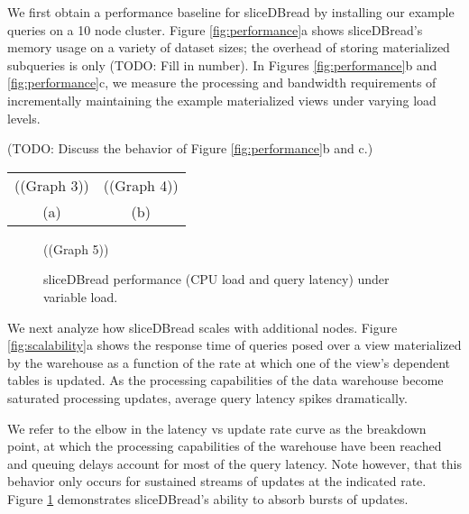 We first obtain a performance baseline for sliceDBread by installing our example queries on a 10 node cluster.  Figure \ref{fig:performance}a shows sliceDBread's memory usage on a variety of dataset sizes; the overhead of storing materialized subqueries is only (TODO: Fill in number).  In Figures \ref{fig:performance}b and \ref{fig:performance}c, we measure the processing and bandwidth requirements of incrementally maintaining the example materialized views under varying load levels.

(TODO: Discuss the behavior of Figure \ref{fig:performance}b and c.)

\begin{figure*}
\begin{center}
\begin{tabular}{cc}
((Graph 3)) & ((Graph 4))\\
(a) & (b)
\end{tabular}
\caption{sliceDBread Scalability.  (a) Update and query processing improvements from adding new nodes to a sliceDBread cluster.  (b) Scalability of sliceDBread as cluster size and data volume are both increased proportionately.}
\label{fig:scalability}
\end{center}
\end{figure*}

\begin{figure}
\begin{center}
((Graph 5))
\caption{sliceDBread performance (CPU load and query latency) under variable load.}
\label{fig:variableload}
\end{center}
\end{figure}

We next analyze how sliceDBread scales with additional nodes.  Figure \ref{fig:scalability}a shows the response time of queries posed over a view materialized by the warehouse as a function of the rate at which one of the view's dependent tables is updated.  As the processing capabilities of the data warehouse become saturated processing updates, average query latency spikes dramatically.

We refer to the elbow in the latency vs update rate curve as the breakdown point, at which the processing capabilities of the warehouse have been reached and queuing delays account for most of the query latency.  Note however, that this behavior only occurs for sustained streams of updates at the indicated rate.  Figure \ref{fig:variableload} demonstrates sliceDBread's ability to absorb bursts of updates.

